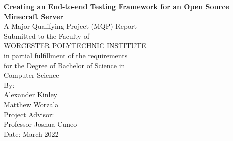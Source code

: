 \documentclass[12pt]{article}
\begin{document}
 



\begin{center}
    \Huge{\textbf{Creating an End-to-end Testing Framework for an Open Source Minecraft Server}} \\ %
    \vspace{10mm} %
    \normalsize{
    A Major Qualifying Project (MQP) Report \\
    Submitted to the Faculty of \\
    WORCESTER POLYTECHNIC INSTITUTE \\
    in partial fulfillment of the requirements \\
    for the Degree of Bachelor of Science in \\
    } %
    \large{
    \vspace{2mm} %
    Computer Science \\ %
    \vspace{5mm} %
    By: \\
    \vspace{2mm} %
    Alexander Kinley \\ %
    Matthew Worzala \\ %
    \vspace {8mm} %
    Project Advisor: \\ %
    \vspace{2mm} %
    Professor Joshua Cuneo \\ %
    \vspace {5mm} %
    Date: March 2022 \\ %
    }
    \vspace{0mm} %
    \begin{figure}[H]
    \centering

\end{figure}
\end{center}
\end{document}
